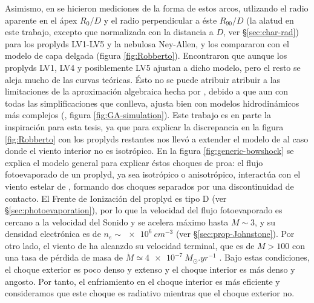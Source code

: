 Asimismo, en \citet{Robberto:2005} se hicieron mediciones de la forma de estos arcos, utlizando el radio aparente en el ápex $R_0/D$ y el radio perpendicular a éste $R_{90}/D$ (la alatud en este trabajo, excepto que normalizada con la distancia a \thC{} $D$, ver \S \ref{sec:char-rad}) para los proplyds LV1-LV5 y la nebulosa Ney-Allen, y los compararon con el modelo de capa delgada \citep{Canto:1996} (figura \ref{fig:Robberto}). Encontraron que aunque los proplyds LV1, LV4 y posiblemente LV5 ajustan a dicho modelo, pero el resto se aleja mucho de las curvas teóricas. Ésto no se puede atribuir atribuir a las limitaciones de la aproximación algebraica hecha por \citet{Canto:1996}, debido a que aun con todas las simplificaciones que conlleva, ajusta bien con modelos hidrodinámicos más complejos (\citet{Garcia-Arredondo:2001}, figura \ref{fig:GA-simulation}). Este trabajo es en parte la inspiración para esta tesis, ya que para explicar la discrepancia en la figura \ref{fig:Robberto} con los proplyds restantes nos llevó a extender el modelo de \citet{Canto:1996} al caso donde el viento interior no es isotrópico. En la figura \ref{fig:generic-bowshock} se explica el modelo general para explicar éstos choques de proa: el flujo fotoevaporado de un proplyd, ya sea isotrópico o anisotrópico, interactúa con el viento estelar de \thC{}, formando dos choques separados por una discontinuidad de contacto. El Frente de Ionización del proplyd es tipo D (ver \S \ref{sec:photoevaporation}), por lo que la velocidad del flujo fotoevaporado es cercano a la velocidad del Sonido y se acelera máximo hasta $M\sim 3$, y su densidad electrónica es de $n_e\sim \SI{e6}{cm^{-3}}$ (ver \S \ref{sec:prop-Johnstone}). Por otro lado, el viento de \thC{} ha alcanzdo su velocidad terminal, que es de $M > 100$ con una tasa de pérdida de masa de $\dot{M} \simeq \SI{4e-7}{M_\odot.yr^{-1}}$ \citep{Gagne:2005}. Bajo estas condiciones, el choque exterior es poco denso y extenso y el choque interior es más denso y angosto. Por tanto, el enfriamiento en el choque interior es más eficiente y consideramos que este choque es radiativo mientras que el choque exterior no.

